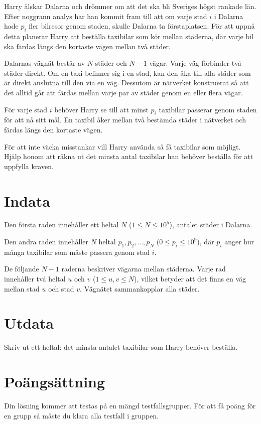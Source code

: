 
\noindent
Harry älskar Dalarna och drömmer om att det ska bli Sveriges högst rankade län. 
Efter noggrann analys har han kommit fram till att om varje stad $i$ i Dalarna hade $p_i$ fler bilresor genom staden, 
skulle Dalarna ta förstaplatsen. För att uppnå detta planerar Harry att beställa taxibilar som kör mellan städerna, 
där varje bil ska färdas längs den kortaste vägen mellan två städer.

Dalarnas vägnät består av $N$ städer och $N-1$ vägar. Varje väg förbinder två städer direkt. Om en taxi befinner
sig i en stad, kan den åka till alla städer som är direkt anslutna till den via en väg. Dessutom är nätverket
konstruerat så att det alltid går att färdas mellan varje par av städer genom en eller flera vägar.

För varje stad $i$ behöver Harry se till att minst $p_i$ taxibilar passerar genom staden för att nå sitt mål. 
En taxibil åker mellan två bestämda städer i nätverket och färdas längs den kortaste vägen.

För att inte väcka misstankar vill Harry använda så få taxibilar som möjligt. 
Hjälp honom att räkna ut det minsta antal taxibilar han behöver beställa för att uppfylla kraven.


\section*{Indata}
Den första raden innehåller ett heltal $N$ ($1 \le N \le 10^5$), antalet städer i Dalarna.

Den andra raden innehåller $N$ heltal $p_1, p_2, ..., p_N$ ($0 \le p_i \le 10^9$), där $p_i$
anger hur många taxibilar som måste passera genom stad $i$.

De följande $N-1$ raderna beskriver vägarna mellan städerna. Varje rad innehåller två heltal $u$ och $v$
($1 \le u, v \le N$), vilket betyder att det finns en väg mellan stad $u$ och stad $v$.
Vägnätet sammankopplar alla städer.

\section*{Utdata}
Skriv ut ett heltal: det minsta antalet taxibilar som Harry behöver beställa.

\section*{Poängsättning}
Din lösning kommer att testas på en mängd testfallsgrupper.
För att få poäng för en grupp så måste du klara alla testfall i gruppen.

